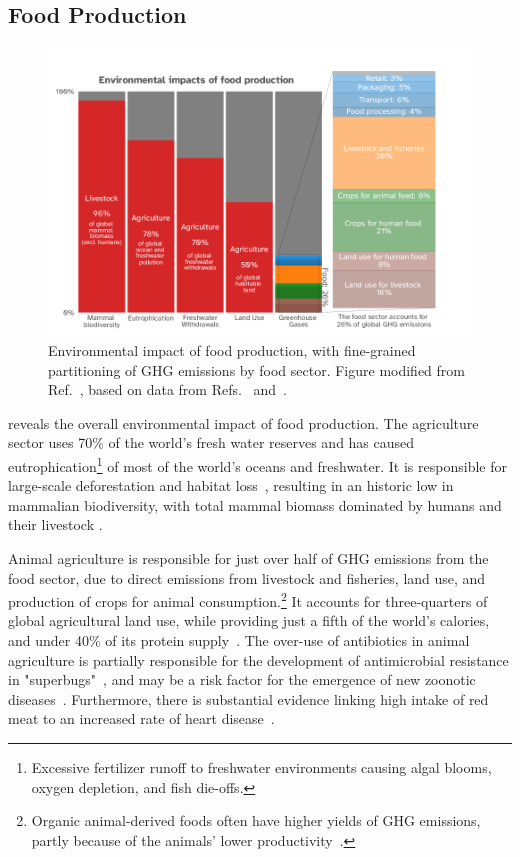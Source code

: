 \documentclass[../SustainableHEP.tex]{subfiles}
\begin{document}
\newpage
\subsection{Food Production\label{sec:agriculture}}

\begin{figure}
    \centering
    \includegraphics[width=\textwidth]{Sections/Figs/Food/FoodEnvironment.png}
    \caption[Environmental impact of food production]{ Environmental impact of food production, with fine-grained partitioning of GHG emissions by food sector. Figure modified from Ref.~\cite{OWID-Food}, based on data from Refs.~\cite{PooreNemecek2018} and~\cite{Bar-On6506}.
    \label{fig:food_impact}}
\end{figure}

 reveals the overall environmental impact of food production.  The agriculture sector uses 70\% of the world's fresh water reserves and has caused eutrophication\footnote{Excessive fertilizer runoff to freshwater environments causing algal blooms, oxygen depletion, and fish die-offs.} of most of the world's oceans and freshwater.  It is responsible for large-scale deforestation and habitat loss~\cite{OWID-Food, PooreNemecek2018, Xu2021}, resulting in an historic low in mammalian biodiversity, with total mammal biomass dominated by humans and their livestock \cite{Bar-On6506}. 

Animal agriculture is responsible for just over half  of GHG emissions from the food sector, due to direct emissions from livestock and fisheries, land use, and production of crops for animal consumption.\footnote{Organic animal-derived foods often have higher yields of GHG emissions, partly because of the animals' lower productivity~\cite{Pieper2020}.}  It accounts for three-quarters of global agricultural land use, while providing just a fifth of the world's calories, and under 40\% of its protein supply~\cite{OWID-Food, PooreNemecek2018, Xu2021}.  The over-use of antibiotics in animal agriculture is partially responsible for the development of antimicrobial resistance in "superbugs"~\cite{AMBR2005}, and may be a risk factor for the emergence of new zoonotic diseases~\cite{Jones8399, Espinosa, Morand}.  Furthermore, there is substantial evidence linking high intake of red meat to an increased rate of heart disease~\cite{meat-health}.
\end{document}
